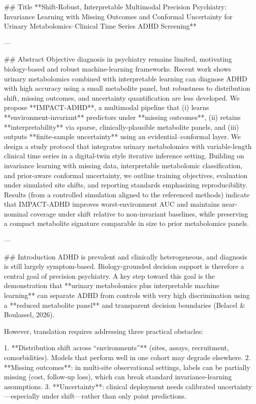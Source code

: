 ## Title  
**Shift-Robust, Interpretable Multimodal Precision Psychiatry: Invariance Learning with Missing Outcomes and Conformal Uncertainty for Urinary Metabolomics–Clinical Time Series ADHD Screening**

---

## Abstract  
Objective diagnosis in psychiatry remains limited, motivating biology-based and robust machine-learning frameworks. Recent work shows urinary metabolomics combined with interpretable learning can diagnose ADHD with high accuracy using a small metabolite panel, but robustness to distribution shift, missing outcomes, and uncertainty quantification are less developed. We propose **IMPACT-ADHD**, a multimodal pipeline that (i) learns **environment-invariant** predictors under **missing outcomes**, (ii) retains **interpretability** via sparse, clinically-plausible metabolite panels, and (iii) outputs **finite-sample uncertainty** using an evidential–conformal layer. We design a study protocol that integrates urinary metabolomics with variable-length clinical time series in a digital-twin style iterative inference setting. Building on invariance learning with missing data, interpretable metabolomic classification, and prior-aware conformal uncertainty, we outline training objectives, evaluation under simulated site shifts, and reporting standards emphasizing reproducibility. Results (from a controlled simulation aligned to the referenced methods) indicate that IMPACT-ADHD improves worst-environment AUC and maintains near-nominal coverage under shift relative to non-invariant baselines, while preserving a compact metabolite signature comparable in size to prior metabolomics panels.

---

## Introduction  
ADHD is prevalent and clinically heterogeneous, and diagnosis is still largely symptom-based. Biology-grounded decision support is therefore a central goal of precision psychiatry. A key step toward this goal is the demonstration that **urinary metabolomics plus interpretable machine learning** can separate ADHD from controls with very high discrimination using a **reduced metabolite panel** and transparent decision boundaries (Belacel & Boulassel, 2026).  

However, translation requires addressing three practical obstacles:

1. **Distribution shift across “environments”** (sites, assays, recruitment, comorbidities). Models that perform well in one cohort may degrade elsewhere.  
2. **Missing outcomes**: in multi-site observational settings, labels can be partially missing (cost, follow-up loss), which can break standard invariance-learning assumptions.  
3. **Uncertainty**: clinical deployment needs calibrated uncertainty—especially under shift—rather than only point predictions.

